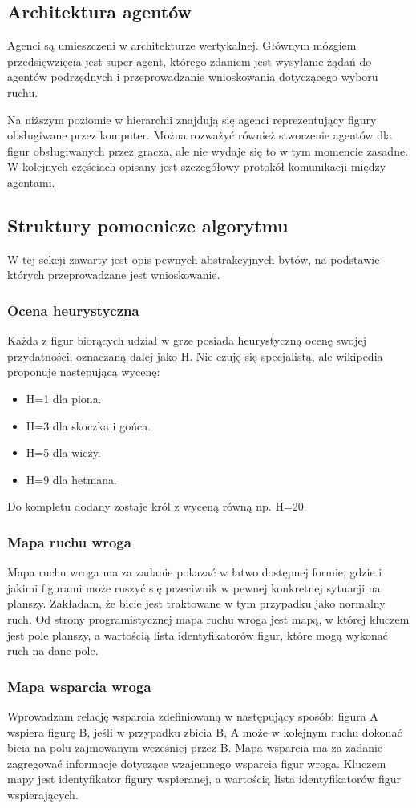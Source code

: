 \documentclass[a4paper,12pt,oneside,notitlepage,onecolumn]{article}
\begin{document}
\subsection{Architektura agentów}
Agenci są umieszczeni w architekturze wertykalnej.
Głównym mózgiem przedsięwzięcia jest super-agent, którego zdaniem jest wysyłanie żądań do agentów podrzędnych i przeprowadzanie wnioskowania dotyczącego wyboru ruchu.

Na niższym poziomie w hierarchii znajdują się agenci reprezentujący figury obsługiwane przez komputer.
Można rozważyć również stworzenie agentów dla figur obsługiwanych przez gracza, ale nie wydaje się to w tym momencie zasadne.
W kolejnych częściach opisany jest szczegółowy protokół komunikacji między agentami.

\subsection{Struktury pomocnicze algorytmu}
W tej sekcji zawarty jest opis pewnych abstrakcyjnych bytów, na podstawie których przeprowadzane jest wnioskowanie.

\subsubsection{Ocena heurystyczna}
Każda z figur biorących udział w grze posiada heurystyczną ocenę swojej przydatności, oznaczaną dalej jako H.
Nie czuję się specjalistą, ale wikipedia proponuje następującą wycenę:
\begin{itemize}
 \item H=1 dla piona.
 \item H=3 dla skoczka i gońca.
 \item H=5 dla wieży.
 \item H=9 dla hetmana.
\end{itemize}

Do kompletu dodany zostaje król z wyceną równą np. H=20.

\subsubsection{Mapa ruchu wroga}
Mapa ruchu wroga ma za zadanie pokazać w łatwo dostępnej formie, gdzie i jakimi figurami może ruszyć się przeciwnik w pewnej konkretnej sytuacji na planszy.
Zakładam, że bicie jest traktowane w tym przypadku jako normalny ruch.
Od strony programistycznej mapa ruchu wroga jest mapą, w której kluczem jest pole planszy, a wartością lista identyfikatorów figur, które mogą wykonać ruch na dane pole.

\subsubsection{Mapa wsparcia wroga}
Wprowadzam relację wsparcia zdefiniowaną w następujący sposób: figura A wspiera figurę B, jeśli w przypadku zbicia B, A może w kolejnym ruchu dokonać bicia na polu zajmowanym wcześniej przez B.
Mapa wsparcia ma za zadanie zagregować informacje dotyczące wzajemnego wsparcia figur wroga.
Kluczem mapy jest identyfikator figury wspieranej, a wartością lista identyfikatorów figur wspierających.
\end{document}
